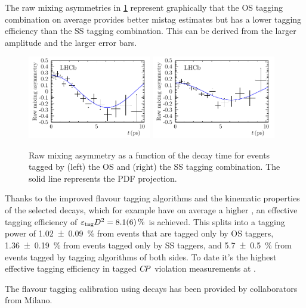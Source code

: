 The raw mixing asymmetries in
\cref{fig:dataanalysis:taggingcalibration:dsdcalibration:rawasymmetries}
represent graphically that the OS tagging combination on average provides
better mistag estimates but has a lower tagging efficiency than the SS tagging
combination. This can be derived from the larger amplitude and the larger
error bars.

\begin{figure}[htb]
\centering
\includegraphics[width=0.48\textwidth]{05-DataAnalysis/tikz/pdf/DsD_MixingAsym_OSComb.pdf}
\includegraphics[width=0.48\textwidth]{05-DataAnalysis/tikz/pdf/DsD_MixingAsym_SSComb.pdf}
\caption{Raw mixing asymmetry as a function of the \Bd decay time for events
tagged by (left) the OS and (right) the SS tagging combination. The solid line
represents the PDF projection.}
\label{fig:dataanalysis:taggingcalibration:dsdcalibration:rawasymmetries}
\end{figure}

Thanks to the improved flavour tagging algorithms and the kinematic properties
of the selected \BdToDD decays, which for example have on average a higher
\pT, an effective tagging efficiency of $\etag D^2= \SI{8.1\pm0.6}{\percent}$
is achieved. This splits into a tagging power of \SI{1.02\pm0.09}{\percent}
from events that are tagged only by OS taggers, \SI{1.36\pm0.19}{\percent}
from events tagged only by SS taggers, and \SI{5.7\pm0.5}{\percent} from
events tagged by tagging algorithms of both sides. To date it's the highest
effective tagging efficiency in tagged $\CP$ violation measurements at \lhcb.

The flavour tagging calibration using \BdToDsD decays has been provided by
collaborators from Milano.

